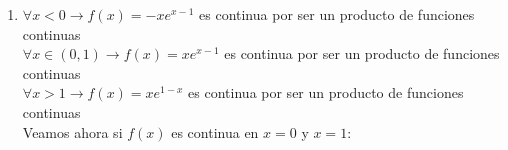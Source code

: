 \begin{enumerate}[label=\color{red}\textbf{\arabic*)}, leftmargin=*]
Como es un cociente, debemos evitar que el denominador sea cero: \begin{center}
	$1-e^x=0\longrightarrow e^x=1\longrightarrow x=\ln(1)=0\longrightarrow\bboxed{x=0}$ No pertence el dominio
\end{center}
Como hay una raiz cuadrada, lo de dentro no puede ser negativo: \[ 1-e^x>0\longrightarrow e^x<1\longrightarrow x<\ln(1)=0\longrightarrow\bboxed{x<0} \]
\item {}
$\forall x<0\longrightarrow f(x)=-xe^{x-1}$ es continua por ser un producto de funciones continuas\\
$\forall x\in(0,1)\longrightarrow f(x)=xe^{x-1}$ es continua por ser un producto de funciones continuas\\
$\forall x>1\longrightarrow f(x)=xe^{1-x}$ es continua por ser un producto de funciones continuas\\
Veamos ahora si $f(x)$ es continua en $x=0$ y $x=1$:
\end{enumerate}
